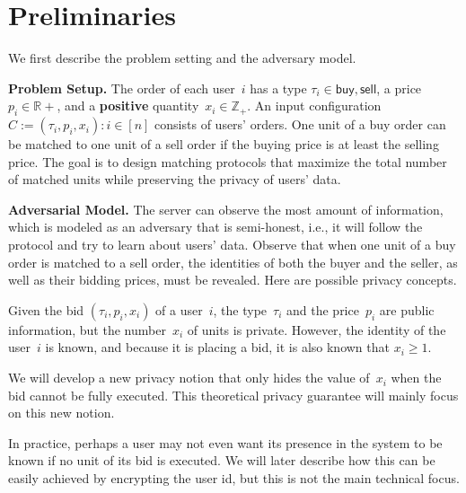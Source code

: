 \section{Preliminaries}
\label{sec:prelim}

We first describe the problem setting and the adversary model.

\noindent \textbf{Problem Setup.} The order of each user~$i$ has a type $\tau_i \in {\mathsf{buy}, \mathsf{sell}}$, a price~$p_i \in \mathbb{R}+$, and a \textbf{positive} quantity~$x_i \in \mathbb{Z}_+$. An input configuration $C := {(\tau_i, p_i, x_i): i \in [n]}$ consists of users' orders. One unit of a buy order can be matched to one unit of a sell order if the buying price is at least the selling price. The goal is to design matching protocols that maximize the total number of matched units while preserving the privacy of users' data.




\noindent \textbf{Adversarial Model.}
The server can observe the most amount of information,
which is modeled as an adversary that is semi-honest, i.e.,
it will follow the protocol and try to learn about users' data.
Observe that when one unit of a buy order is matched
to a sell order, the identities of both the buyer and the seller,
as well as their bidding prices, must be revealed.
Here are possible privacy concepts.

\begin{compactitem}

\item Given the bid $(\tau_i, p_i, x_i)$
of a user~$i$, the type~$\tau_i$ and the price~$p_i$ are public information,
but the number~$x_i$ of units is private.
However, the identity of the user~$i$ is known, and because it is placing a bid,
it is also known that $x_i \geq 1$.

We will develop a new privacy notion that only hides the value of~$x_i$
when the bid cannot be fully executed. This theoretical privacy guarantee
will mainly focus on this new notion.

\item In practice, perhaps a user may not even want its presence in the system
to be known if no unit of its bid is executed. We will later describe
how this can be easily achieved by encrypting the user id, but this is
not the main technical focus.

\end{compactitem}


